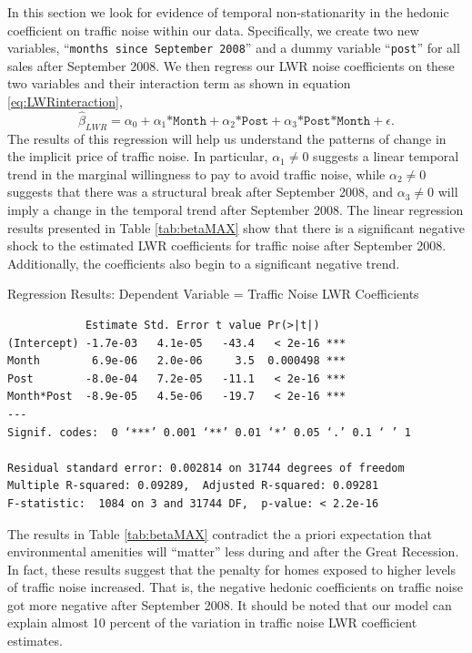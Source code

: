 \documentclass{article}\usepackage{graphicx, color}
\begin{document}
In this section we look for evidence of temporal non-stationarity in the hedonic coefficient on traffic noise within our data. Specifically, we create two new variables, ``\texttt{months since September 2008}'' and a dummy variable ``\texttt{post}'' for all sales after September 2008. We then regress our LWR noise coefficients on these two variables and their interaction term as shown in equation \eqref{eq:LWRinteraction}, 
\begin{equation}\label{eq:LWRinteraction}
\hat{\beta}_{LWR} = \alpha _0 + \alpha _1 \texttt{*Month} + \alpha _2  \texttt{*Post} + \alpha _3 \texttt{*Post*Month} + \epsilon.
\end{equation}
The results of this regression will help us understand the patterns of change in the implicit price of traffic noise. In particular, $\alpha_1 \neq 0$ suggests a linear temporal trend in the marginal willingness to pay to avoid traffic noise, while $\alpha_2 \neq 0$ suggests that there was a structural break after September 2008, and $\alpha_3 \neq 0$ will imply a change in the temporal trend after September 2008. The linear regression results presented in Table \ref{tab:betaMAX} show that there is a significant negative shock to the estimated LWR coefficients for traffic noise after September 2008. Additionally, the coefficients also begin to a significant negative trend.
\begin{table}[h]
\caption{Regression Results: Dependent Variable = Traffic Noise LWR Coefficients}\label{tab:betaMAX}
\begin{verbatim}
            Estimate Std. Error t value Pr(>|t|)   
(Intercept) -1.7e-03   4.1e-05   -43.4   < 2e-16 ***
Month        6.9e-06   2.0e-06     3.5  0.000498 ***
Post        -8.0e-04   7.2e-05   -11.1   < 2e-16 ***
Month*Post  -8.9e-05   4.5e-06   -19.7   < 2e-16 ***
---
Signif. codes:  0 ‘***’ 0.001 ‘**’ 0.01 ‘*’ 0.05 ‘.’ 0.1 ‘ ’ 1 

Residual standard error: 0.002814 on 31744 degrees of freedom
Multiple R-squared: 0.09289,  Adjusted R-squared: 0.09281 
F-statistic:  1084 on 3 and 31744 DF,  p-value: < 2.2e-16 
\end{verbatim}
\end{table}

The results in Table \ref{tab:betaMAX} contradict the a priori expectation that environmental amenities will ``matter'' less during and after the Great Recession. In fact, these results suggest that the penalty for homes exposed to higher levels of traffic noise increased. That is, the negative hedonic coefficients on traffic noise got more negative after September 2008. It should be noted that our model can explain almost 10 percent of the variation in traffic noise LWR coefficient estimates. 
\end{document}
